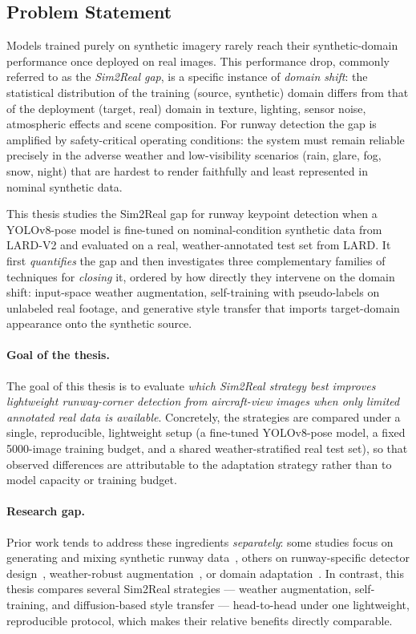 \subsection{Problem Statement}
\label{subsec:problem}
Models trained purely on synthetic imagery rarely reach their synthetic-domain
performance once deployed on real images. This performance drop, commonly referred
to as the \emph{Sim2Real gap}, is a specific instance of \emph{domain shift}:
the statistical distribution of the training (source, synthetic) domain differs
from that of the deployment (target, real) domain in texture, lighting, sensor
noise, atmospheric effects and scene composition. For runway detection the gap is
amplified by safety-critical operating conditions: the system must remain reliable
precisely in the adverse weather and low-visibility scenarios (rain, glare, fog,
snow, night) that are hardest to render faithfully and least represented in nominal
synthetic data.

This thesis studies the Sim2Real gap for runway keypoint detection when a
YOLOv8-pose model is fine-tuned on nominal-condition synthetic data from LARD-V2
and evaluated on a real, weather-annotated test set from LARD. It first
\emph{quantifies} the gap and then investigates three complementary families of
techniques for \emph{closing} it, ordered by how directly they intervene on the
domain shift: input-space weather augmentation, self-training with pseudo-labels
on unlabeled real footage, and generative style transfer that imports
target-domain appearance onto the synthetic source.

\paragraph{Goal of the thesis.}
The goal of this thesis is to evaluate \emph{which Sim2Real strategy best improves
lightweight runway-corner detection from aircraft-view images when only limited
annotated real data is available}. Concretely, the strategies are compared under a
single, reproducible, lightweight setup (a fine-tuned YOLOv8-pose model, a fixed
5000-image training budget, and a shared weather-stratified real test set), so that
observed differences are attributable to the adaptation strategy rather than to
model capacity or training budget.

\paragraph{Research gap.}
Prior work tends to address these ingredients \emph{separately}: some studies focus
on generating and mixing synthetic runway data~\cite{syntheticrunway2025}, others on
runway-specific detector design~\cite{yolorwy2024}, weather-robust
augmentation~\cite{weatherrobust2025}, or domain adaptation~\cite{ganin2015dann}. In
contrast, this thesis compares several Sim2Real strategies --- weather augmentation,
self-training, and diffusion-based style transfer --- head-to-head under one
lightweight, reproducible protocol, which makes their relative benefits directly
comparable.

